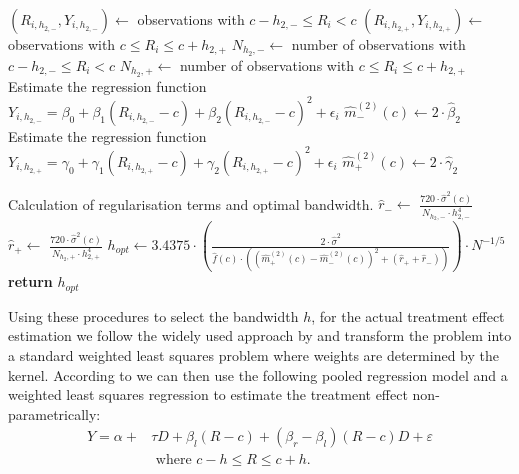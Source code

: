 \documentclass[11pt, a4paper, leqno]{article}
\numberwithin{equation}{section}
\numberwithin{figure}{section}
\numberwithin{table}{section}
\numberwithin{algorithm}{section}
\begin{document}
\begin{algorithm}
\begin{algorithmic}[1]
		\State $(R_{i, h_{2, -}}, Y_{i, h_{2, -}}) \gets$ observations with $c-h_{2, -} \leq R_{i} < c$
		\State $(R_{i, h_{2, +}}, Y_{i, h_{2, +}}) \gets$ observations with $c \leq R_{i} \leq c+h_{2, +}$
		\State $N_{h_{2}, -} \gets$ number of observations with $c-h_{2, -} \leq R_{i} < c$
		\State $N_{h_{2}, +} \gets$ number of observations with $c \leq R_{i} \leq c+h_{2, +}$
		\State Estimate the regression function  $Y_{i, h_{2,-}} = \beta_{0} + \beta_{1} (R_{i, h_{2, -}}-c) + \beta_{2} (R_{i, h_{2, -}}-c)^{2} + \epsilon_{i}$
		\State $\widehat{m}^{(2)}_{-}(c) \gets 2 \cdot \widehat{\beta}_{2}$ {\color{blue} }
		\State Estimate the regression function  $Y_{i, h_{2,+}} = \gamma_{0} + \gamma_{1} (R_{i, h_{2, +}}-c) + \gamma_{2} (R_{i, h_{2, +}}-c)^{2} + \epsilon_{i}$
		\State $\widehat{m}^{(2)}_{+}(c) \gets 2 \cdot \widehat{\gamma}_{2}$ {\color{blue} }

		\Stepthree Calculation of regularisation terms and optimal bandwidth.
		\State $\widehat{r}_{-} \gets$ $\frac{720 \cdot \widehat{\sigma}^{2}(c)}{N_{h_{2}, -} \cdot h_{2, -}^{4}}$
		\State $\widehat{r}_{+} \gets$ $\frac{720 \cdot \widehat{\sigma}^{2}(c)}{N_{h_{2}, +} \cdot h_{2, +}^{4}}$
		\State $h_{opt} \gets 3.4375 \cdot \left(\frac{2 \cdot \widehat{\sigma}^{2}}{\widehat{f}(c) \cdot \left( \left( \widehat{m}^{(2)}_{+}(c) - \widehat{m}^{(2)}_{-}(c) \right)^{2} + \left( \widehat{r}_{+} + \widehat{r}_{-} \right) \right)}\right) \cdot N^{-1/5}$
		\State \textbf{return} $h_{opt}$
	\end{algorithmic}
\end{algorithm}

Using these procedures to select the bandwidth $h$, for the actual treatment effect estimation we follow the widely used approach by \cite{fan_gij} and transform the problem into a standard weighted least squares problem where weights are determined by the kernel. According to \cite{lee_lemieux} we can then use the following pooled regression model and a weighted least squares regression to estimate the treatment effect non-parametrically:
\begin{align}
Y = \alpha + & \tau D + \beta_{l} (R-c) + (\beta_{r} - \beta_{l}) (R-c) D + \varepsilon \\
&\text{ where } c - h \leq R \leq c + h. \nonumber
\label{eq: model_non_param}
\end{align}
\end{document}
